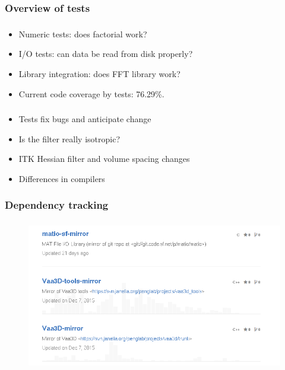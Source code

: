 \documentclass{beamer}
\begin{document}
\subsubsection{Overview of tests}
\begin{frame}\frametitle{\subsubsecname}
	\begin{itemize}
		\item<1-> Numeric tests: does factorial work?
		\item<2-> I/O tests: can data be read from disk properly?
		\item<3-> Library integration: does FFT library work?
		\item<4-> Current code coverage by tests: 76.29\%.
	\end{itemize}
\end{frame}

\begin{frame}\frametitle{\subsubsecname}
	\begin{itemize}
		\item<1-> Tests fix bugs and anticipate change
		\item<2-> Is the filter really isotropic?
		\item<3-> ITK Hessian filter and volume spacing changes
		\item<3-> Differences in compilers
	\end{itemize}
\end{frame}

\subsubsection{Dependency tracking}
\begin{frame}\frametitle{\subsubsecname}
		\begin{figure}[tbp]
			\centering
			\includegraphics[width=1.0\textwidth]{gfx/gh-dep_0}
		\end{figure}
\end{frame}
\end{document}
